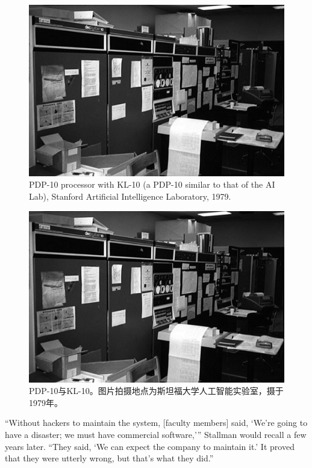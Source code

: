 \ifdefined\eng
\begin{figure}[ht] \centering
  \includegraphics[width=\textwidth]{KL10_1979}
  \caption{PDP-10 processor with KL-10 (a PDP-10 similar to that of the AI Lab), Stanford Artificial Intelligence Laboratory, 1979.}
\end{figure}
\fi

\ifdefined\chs
\begin{figure}[ht] \centering
  \includegraphics[width=\textwidth]{KL10_1979}
  \caption{PDP-10与KL-10。图片拍摄地点为斯坦福大学人工智能实验室，摄于1979年。}
\end{figure}
\fi
\fi

\ifdefined\eng
``Without hackers to maintain the system, [faculty members] said, `We're going to have a disaster; we must have commercial software,'\hspace{0.01in}'' Stallman would recall a few years later. ``They said, `We can expect the company to maintain it.' It proved that they were utterly wrong, but that's what they did.''
\fi

